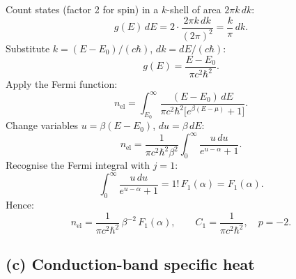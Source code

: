 \documentclass[11pt]{article}
\begin{document}
Count states (factor 2 for spin) in a $k$-shell of area $2\pi k\,dk$:
\begin{equation}
g(E)\,dE=2\cdot\frac{2\pi k\,dk}{(2\pi)^{2}}=\frac{k}{\pi}\,dk.
\end{equation}
Substitute $k=(E-E_0)/(c\hbar)$, $dk=dE/(c\hbar)$:
\begin{equation}
g(E)=\frac{E-E_0}{\pi c^{2}\hbar^{2}}.
\label{eq:dos}
\end{equation}
Apply the Fermi function:
\begin{equation}
n_{\mathrm{el}}=\int_{E_{0}}^{\infty}\frac{(E-E_0)\,dE}{\pi c^{2}\hbar^{2}\bigl[e^{\beta(E-\mu)}+1\bigr]}.
\end{equation}
Change variables $u=\beta(E-E_0)$, $du=\beta\,dE$:
\begin{equation}
n_{\mathrm{el}}=\frac{1}{\pi c^{2}\hbar^{2}\beta^{2}}\int_{0}^{\infty}\frac{u\,du}{e^{u-\alpha}+1}.
\end{equation}
Recognise the Fermi integral with $j=1$:
\begin{equation}
\int_0^\infty\frac{u\,du}{e^{u-\alpha}+1}=1!\,F_1(\alpha)=F_1(\alpha).
\end{equation}
Hence:
\begin{equation}
\boxed{\,n_{\mathrm{el}}=\frac{1}{\pi c^{2}\hbar^{2}}\,\beta^{-2}\,F_{1}(\alpha),\qquad C_{1}=\frac{1}{\pi c^{2}\hbar^{2}},\quad p=-2.\,}
\label{eq:nel-final}
\end{equation}

\subsection*{(c) Conduction-band specific heat}
\end{document}
